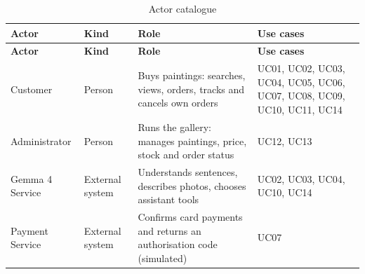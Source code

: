 \begin{longtable}{@{}P{3.0cm}P{2.4cm}P{6.0cm}P{3.6cm}@{}}
\caption{Actor catalogue}\label{tab:actors}\\
\toprule
\small \textbf{Actor} & \small \textbf{Kind} & \small \textbf{Role} & \small \textbf{Use cases}\\
\midrule
\endfirsthead
\toprule
\small \textbf{Actor} & \small \textbf{Kind} & \small \textbf{Role} & \small \textbf{Use cases}\\
\midrule
\endhead
\bottomrule
\endlastfoot
\small Customer & \small Person & \small Buys paintings: searches, views, orders, tracks and cancels own orders & \small UC01, UC02, UC03, UC04, UC05, UC06, UC07, UC08, UC09, UC10, UC11, UC14\\
\small Administrator & \small Person & \small Runs the gallery: manages paintings, price, stock and order status & \small UC12, UC13\\
\small Gemma 4 Service & \small External system & \small Understands sentences, describes photos, chooses assistant tools & \small UC02, UC03, UC04, UC10, UC14\\
\small Payment Service & \small External system & \small Confirms card payments and returns an authorisation code (simulated) & \small UC07\\
\end{longtable}
